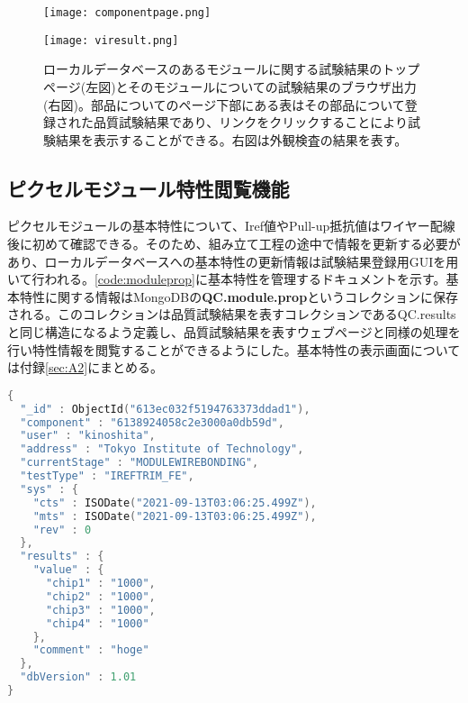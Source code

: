 \begin{figure}[tbp]
  \begin{minipage}[b]{0.45\linewidth}
    \centering
    \texttt{[image: componentpage.png]}
  \end{minipage}
  \begin{minipage}[b]{0.45\linewidth}
    \centering
    \texttt{[image: viresult.png]}
  \end{minipage}
    \caption[試験結果のブラウザ出力]{ローカルデータベースのあるモジュールに関する試験結果のトップページ(左図)とそのモジュールについての試験結果のブラウザ出力(右図)。部品についてのページ下部にある表はその部品について登録された品質試験結果であり、リンクをクリックすることにより試験結果を表示することができる。右図は外観検査の結果を表す。}
    \label{fig:noneleresult}
\end{figure}

\subsection{ピクセルモジュール特性閲覧機能}
\label{sec:prop-view}

ピクセルモジュールの基本特性について、Iref値やPull-up抵抗値はワイヤー配線後に初めて確認できる。そのため、組み立て工程の途中で情報を更新する必要があり、ローカルデータベースへの基本特性の更新情報は試験結果登録用GUIを用いて行われる。\cref{code:moduleprop}に基本特性を管理するドキュメントを示す。基本特性に関する情報はMongoDBの\textbf{QC.module.prop}というコレクションに保存される。このコレクションは品質試験結果を表すコレクションであるQC.resultsと同じ構造になるよう定義し、品質試験結果を表すウェブページと同様の処理を行い特性情報を閲覧することができるようにした。基本特性の表示画面については付録\ref{sec:A2}にまとめる。

\begin{lstlisting}[caption=ピクセルモジュールの基本特定更新情報を表すドキュメント。,label=code:moduleprop, language=C++]
{
  "_id" : ObjectId("613ec032f5194763373ddad1"),
  "component" : "6138924058c2e3000a0db59d",
  "user" : "kinoshita",
  "address" : "Tokyo Institute of Technology",
  "currentStage" : "MODULEWIREBONDING",
  "testType" : "IREFTRIM_FE",
  "sys" : {
    "cts" : ISODate("2021-09-13T03:06:25.499Z"),
    "mts" : ISODate("2021-09-13T03:06:25.499Z"),
    "rev" : 0
  },
  "results" : {
    "value" : {
      "chip1" : "1000",
      "chip2" : "1000",
      "chip3" : "1000",
      "chip4" : "1000"
    },
    "comment" : "hoge"
  },
  "dbVersion" : 1.01
}
\end{lstlisting}

